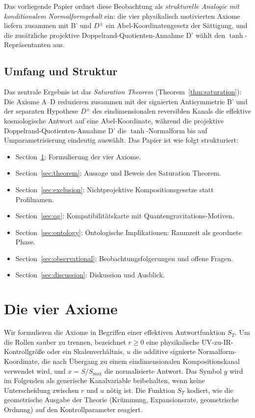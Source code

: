 \documentclass[aps,prd,twocolumn,superscriptaddress,nofootinbib]{revtex4-2}
\begin{document}
Das vorliegende Papier ordnet diese Beobachtung als \textit{strukturelle Analogie mit konditionalem Normalformgehalt} ein: die vier physikalisch motivierten Axiome liefern zusammen mit B' und $D^\pm$ ein Abel-Koordinatengesetz der Sättigung, und die zusätzliche projektive Doppelrand-Quotienten-Annahme D' wählt den $\tanh$-Repräsentanten aus.

\subsection{Umfang und Struktur}

Das zentrale Ergebnis ist das \textit{Saturation Theorem} (Theorem~\ref{thm:saturation}): Die Axiome A--D reduzieren zusammen mit der signierten Antisymmetrie B' und der separaten Hypothese $D^\pm$ des eindimensionalen reversiblen Kanals die effektive kosmologische Antwort auf eine Abel-Koordinate, während die projektive Doppelrand-Quotienten-Annahme D' die $\tanh$-Normalform bis auf Umparametrisierung eindeutig auswählt. Das Papier ist wie folgt strukturiert:

\begin{itemize}
\item Section~\ref{sec:axioms}: Formulierung der vier Axiome.
\item Section~\ref{sec:theorem}: Aussage und Beweis des Saturation Theorem.
\item Section~\ref{sec:exclusion}: Nichtprojektive Kompositionsgesetze statt Profilnamen.
\item Section~\ref{sec:qg}: Kompatibilitätskarte mit Quantengravitations-Motiven.
\item Section~\ref{sec:ontology}: Ontologische Implikationen: Raumzeit als geordnete Phase.
\item Section~\ref{sec:observational}: Beobachtungsfolgerungen und offene Fragen.
\item Section~\ref{sec:discussion}: Diskussion und Ausblick.
\end{itemize}


\section{Die vier Axiome}
\label{sec:axioms}

Wir formulieren die Axiome in Begriffen einer effektiven Antwortfunktion $S_T$. Um die Rollen sauber zu trennen, bezeichnet $r\geq0$ eine physikalische UV-zu-IR-Kontrollgröße oder ein Skalenverhältnis, $u$ die additive signierte Normalform-Koordinate, die nach Übergang zu einem eindimensionalen Kompositionskanal verwendet wird, und $x=S/S_{\max}$ die normalisierte Antwort. Das Symbol $g$ wird im Folgenden als generische Kanalvariable beibehalten, wenn keine Unterscheidung zwischen $r$ und $u$ nötig ist. Die Funktion $S_T$ kodiert, wie die geometrische Ausgabe der Theorie (Krümmung, Expansionsrate, geometrische Ordnung) auf den Kontrollparameter reagiert.
\end{document}
